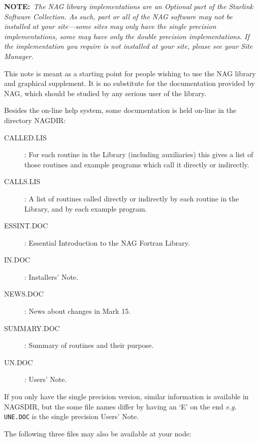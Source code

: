 {\bf NOTE:}~{\em The NAG library implementations are an Optional part of the
Starlink Software Collection. As such, part or all of the NAG software may not
be installed at your site---some sites may only have the single precision
implementations, some may have only the double precision implementations. If
the implementation you require is not installed at your site, please see your
Site Manager.}

This note is meant as a starting point for people wishing to use the NAG
library and graphical supplement. It is no substitute for the documentation
provided by NAG, which should be studied by any serious user of the library.

Besides the on-line help system, some documentation is held on-line in the
directory NAGDIR:

\begin{description}
\begin{description}

\item [CALLED.LIS] : For each routine in the Library (including auxiliaries)
this gives a list of those routines and example programs which call it directly
or indirectly.

\item [CALLS.LIS] : A list of routines called directly or indirectly by each
routine in the Library, and by each example program.

\item [ESSINT.DOC] : Essential Introduction to the NAG Fortran Library.

\item [IN.DOC] : Installers' Note.

\item [NEWS.DOC] : News about changes in Mark 15.

\item [SUMMARY.DOC] : Summary of routines and their purpose.

\item [UN.DOC] : Users' Note.

\end{description}
\end{description}

If you only have the single precision version, similar information is
available in NAGSDIR, but the some file names differ by having an `E' on the
end {\it e.g.} {\tt UNE.DOC} is the single precision Users' Note.

The following three files may also be available at your node:

